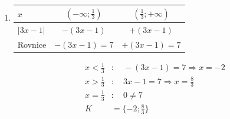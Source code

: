 \documentclass[11pt,a4paper]{article}
\begin{document}
\begin{zadaniReseniBox}[title={Domácí úkol}]
\begin{enumerate}[label=\alph*),itemsep=1pt]
\begin{center}
\begin{tabular}{@{}lcc@{}}
\bottomrule\end{tabular}\endgroup\end{center}
\[\begin{aligned}
x<\frac53&:\quad 5-3x=x+1\Rightarrow x=1\\
x>\frac53&:\quad 3x-5=x+1\Rightarrow x=3\\
x=\frac53&:\quad 0\ne\frac83\\
K&=\{1;3\}
\end{aligned}\]
\item
\begin{center}\begingroup\footnotesize
\renewcommand{\arraystretch}{1.25}
\begin{tabular}{@{}lcc@{}}\toprule
$x$ & $(-\infty;\frac13)$ & $(\frac13;+\infty)$ \\
\midrule
$|3x-1|$ & $-(3x-1)$ & $+(3x-1)$ \\
\midrule
Rovnice & $-(3x-1)=7$ & $+(3x-1)=7$ \\
\bottomrule\end{tabular}\endgroup\end{center}
\[\begin{aligned}
x<\frac13&:\quad -(3x-1)=7\Rightarrow x=-2\\
x>\frac13&:\quad 3x-1=7\Rightarrow x=\frac83\\
x=\frac13&:\quad 0\ne7\\
K&=\{-2;\frac83\}
\end{aligned}\]
\end{enumerate}
\end{zadaniReseniBox}
\end{document}
